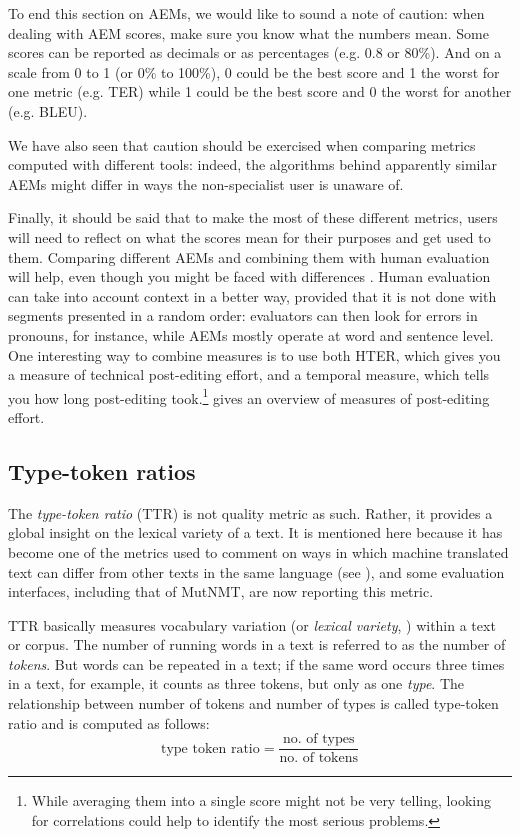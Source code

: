 \documentclass[output=paper]{langscibook}
\begin{document}
To end this section on AEMs, we would like to sound a note of caution: when dealing with AEM scores, make sure you know what the numbers mean. Some scores can be reported as decimals or as percentages (e.g. 0.8 or 80\%). And on a scale from 0 to 1 (or 0\% to 100\%), 0 could be the best score and 1 the worst for one metric (e.g. TER) while 1 could be the best score and 0 the worst for another (e.g. BLEU).

We have also seen that caution should be exercised when comparing metrics computed with different tools: indeed, the algorithms behind apparently similar AEMs might differ in ways the non-specialist user is unaware of.

Finally, it should be said that to make the most of these different metrics, users will need to reflect on what the scores mean for their purposes and get used to them. Comparing different AEMs and combining them with human evaluation will help, even though you might be faced with differences \citep[134]{Doherty2017}. Human evaluation can take into account context in a better way, provided that it is not done with segments presented in a random order: evaluators can then look for errors in pronouns, for instance, while AEMs mostly operate at word and sentence level. One interesting way to combine measures is to use both HTER, which gives you a measure of technical post-editing effort, and a temporal measure, which tells you how long post-editing took.\footnote{While averaging them into a single score might not be very telling, looking for correlations could help to identify the most serious problems.}  gives an overview of measures of post-editing effort.

\subsection{Type-token ratios}

The \textit{type-token ratio} (TTR) is not quality metric as such. Rather, it provides a global insight on the lexical variety of a text. It is mentioned here because it has become one of the metrics used to comment on ways in which machine translated text can differ from other texts in the same language (see \citealt{Toral2019}), and some evaluation interfaces, including that of MutNMT, are now reporting this metric.

TTR basically measures vocabulary variation (or \textit{lexical variety}, \citealt{Williamson2009}) within a text or corpus. The number of running words in a text is referred to as the number of \textit{tokens}. But words can be repeated in a text; if the same word occurs three times in a text, for example, it counts as three tokens, but only as one \textit{type}. The relationship between number of tokens and number of types is called type-token ratio and is computed as follows:
\begin{equation}
\text{type token ratio}=\frac{\text{no. of types}}{\text{no. of tokens}}
\end{equation}
\end{document}
